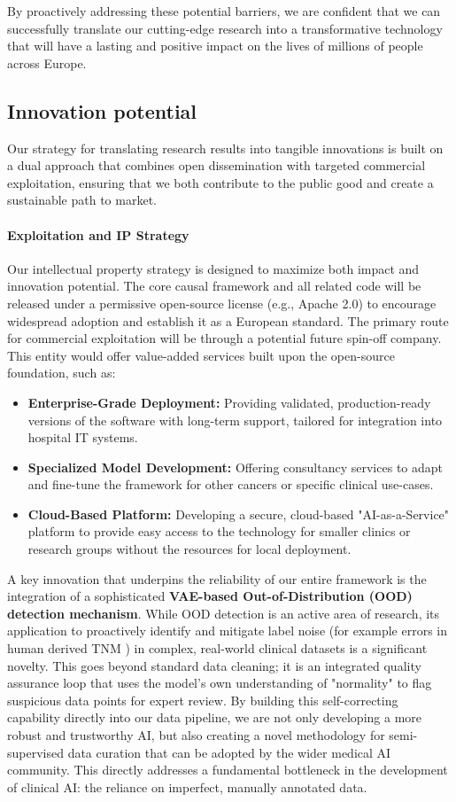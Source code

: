 \documentclass[11pt, a4paper]{article}
\begin{document}
By proactively addressing these potential barriers, we are confident that we can successfully translate our cutting-edge research into a transformative technology that will have a lasting and positive impact on the lives of millions of people across Europe.

\subsection{Innovation potential}
Our strategy for translating research results into tangible innovations is built on a dual approach that combines open dissemination with targeted commercial exploitation, ensuring that we both contribute to the public good and create a sustainable path to market.

\paragraph{Exploitation and IP Strategy}
Our intellectual property strategy is designed to maximize both impact and innovation potential. The core causal framework and all related code will be released under a permissive open-source license (e.g., Apache 2.0) to encourage widespread adoption and establish it as a European standard. The primary route for commercial exploitation will be through a potential future spin-off company. This entity would offer value-added services built upon the open-source foundation, such as:
\begin{itemize}
    \item \textbf{Enterprise-Grade Deployment:} Providing validated, production-ready versions of the software with long-term support, tailored for integration into hospital IT systems.
    \item \textbf{Specialized Model Development:} Offering consultancy services to adapt and fine-tune the framework for other cancers or specific clinical use-cases.
    \item \textbf{Cloud-Based Platform:} Developing a secure, cloud-based "AI-as-a-Service" platform to provide easy access to the technology for smaller clinics or research groups without the resources for local deployment.
\end{itemize}
A key innovation that underpins the reliability of our entire framework is the integration of a sophisticated \textbf{VAE-based Out-of-Distribution (OOD) detection mechanism}. While OOD detection is an active area of research, its application to proactively identify and mitigate label noise (for example errors in human derived TNM ) in complex, real-world clinical datasets is a significant novelty. This goes beyond standard data cleaning; it is an integrated quality assurance loop that uses the model's own understanding of "normality" to flag suspicious data points for expert review. By building this self-correcting capability directly into our data pipeline, we are not only developing a more robust and trustworthy AI, but also creating a novel methodology for semi-supervised data curation that can be adopted by the wider medical AI community. This directly addresses a fundamental bottleneck in the development of clinical AI: the reliance on imperfect, manually annotated data.
\end{document}
